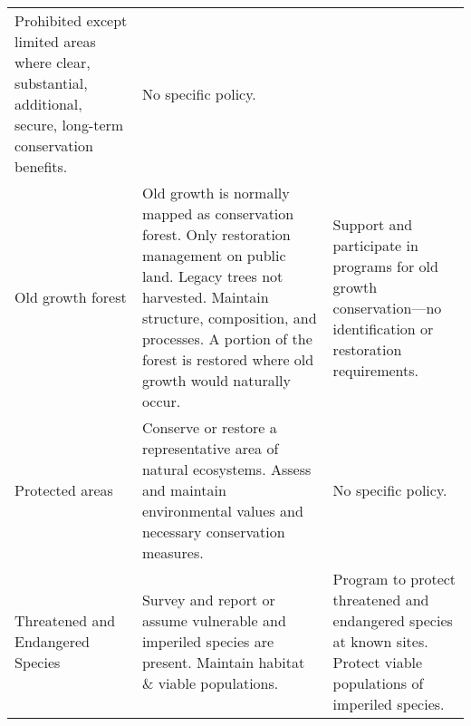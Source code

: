 \begin{table}
\begin{longtable}[]{@{}lll@{}}
\begin{minipage}[t]{0.36\columnwidth}
Prohibited except limited areas where clear, substantial, additional,
secure, long-term conservation benefits.\strut
\end{minipage} & \begin{minipage}[t]{0.36\columnwidth}\raggedright\strut
No specific policy.\strut
\end{minipage}\tabularnewline
\begin{minipage}[t]{0.20\columnwidth}\raggedright\strut
Old growth forest\strut
\end{minipage} & \begin{minipage}[t]{0.36\columnwidth}\raggedright\strut
Old growth is normally mapped as conservation forest. Only restoration
management on public land. Legacy trees not harvested. Maintain
structure, composition, and processes. A portion of the forest is
restored where old growth would naturally occur.\strut
\end{minipage} & \begin{minipage}[t]{0.36\columnwidth}\raggedright\strut
Support and participate in programs for old growth conservation---no
identification or restoration requirements.\strut
\end{minipage}\tabularnewline
\begin{minipage}[t]{0.20\columnwidth}\raggedright\strut
Protected areas\strut
\end{minipage} & \begin{minipage}[t]{0.36\columnwidth}\raggedright\strut
Conserve or restore a representative area of natural ecosystems. Assess
and maintain environmental values and necessary conservation
measures.\strut
\end{minipage} & \begin{minipage}[t]{0.36\columnwidth}\raggedright\strut
No specific policy.\strut
\end{minipage}\tabularnewline
\begin{minipage}[t]{0.20\columnwidth}\raggedright\strut
Threatened and Endangered Species\strut
\end{minipage} & \begin{minipage}[t]{0.36\columnwidth}\raggedright\strut
Survey and report or assume vulnerable and imperiled species are
present. Maintain habitat \& viable populations.\strut
\end{minipage} & \begin{minipage}[t]{0.36\columnwidth}\raggedright\strut
Program to protect threatened and endangered species at known sites.
Protect viable populations of imperiled species.\strut
\end{minipage}\tabularnewline

\end{longtable}
\end{table}
